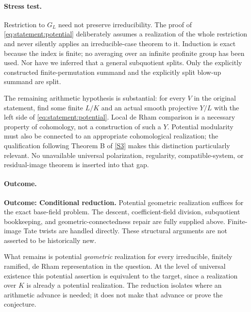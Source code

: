 \documentclass[11pt,a4paper]{article}
\newcommand{\sref}[2]{\hyperlink{source:#1:#2}{[S#2]}}
\numberwithin{equation}{section}
\begin{document}
\paragraph{Stress test.}
Restriction to $G_L$ need not preserve irreducibility. The proof of
\eqref{eq:statement:potential} deliberately assumes a realization of the whole
restriction and never silently applies an irreducible-case theorem to it.
Induction is exact because the index is finite; no averaging over an
infinite profinite group has been used. Nor have we inferred that a general
subquotient splits. Only the explicitly constructed finite-permutation
summand and the explicitly split blow-up summand are split.

The remaining arithmetic hypothesis is substantial: for every $V$ in the
original statement, find some finite $L/K$ and an actual smooth projective
$Y/L$ with the left side of \eqref{eq:statement:potential}. Local de Rham comparison
is a necessary property of cohomology, not a construction of such a $Y$.
Potential modularity must also be connected to an appropriate cohomological
realization; the qualification following Theorem B of \sref{statement}{3} makes
this distinction particularly relevant. No unavailable universal
polarization, regularity, compatible-system, or residual-image theorem is
inserted into that gap.

\paragraph{Outcome.}
\textbf{Outcome: Conditional reduction.}
Potential geometric realization suffices for the exact base-field problem.
The descent, coefficient-field division, subquotient bookkeeping, and
geometric-connectedness repair are fully supplied above. Finite-image Tate
twists are handled directly. These structural arguments are not asserted
to be historically new.

What remains is potential \emph{geometric} realization for every irreducible,
finitely ramified, de Rham representation in the question. At the level of
universal existence this potential assertion is equivalent to the target,
since a realization over $K$ is already a potential realization. The
reduction isolates where an arithmetic advance is needed; it does not make
that advance or prove the conjecture.
\end{document}
